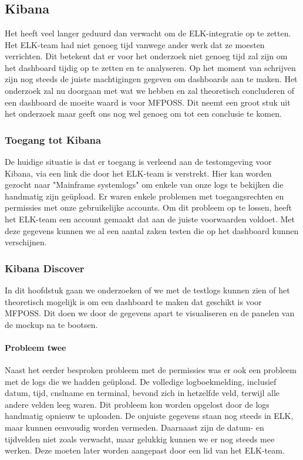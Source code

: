 \chapter{}%
\label{ch:Opstellen Dashboard}

\section{Kibana}

Het heeft veel langer geduurd dan verwacht om de ELK-integratie op te zetten. Het ELK-team had niet genoeg tijd vanwege ander werk dat ze moesten verrichten. Dit betekent dat er voor het onderzoek niet genoeg tijd zal zijn om het dashboard tijdig op te zetten en te analyseren. Op het moment van schrijven zijn nog steeds de juiste machtigingen gegeven om dashboards aan te maken. Het onderzoek zal nu doorgaan met wat we hebben en zal theoretisch concluderen of een dashboard de moeite waard is voor MFPOSS. Dit neemt een groot stuk uit het onderzoek maar geeft ons nog wel genoeg om tot een conclusie te komen.

\subsection{Toegang tot Kibana}
De huidige situatie is dat er toegang is verleend aan de testomgeving voor Kibana, via een link die door het ELK-team is verstrekt. Hier kan worden gezocht naar "Mainframe systemlogs" om enkele van onze logs te bekijken die handmatig zijn geüpload. Er waren enkele problemen met toegangsrechten en permissies met onze gebruikelijke accounts. Om dit probleem op te lossen, heeft het ELK-team een account gemaakt dat aan de juiste voorwaarden voldoet. Met deze gegevens kunnen we al een aantal zaken testen die op het dashboard kunnen verschijnen.

\subsection{Kibana Discover}
In dit hoofdstuk gaan we onderzoeken of we met de testlogs kunnen zien of het theoretisch mogelijk is om een dashboard te maken dat geschikt is voor MFPOSS. Dit doen we door de gegevens apart te visualiseren en de panelen van de mockup na te bootsen.

\subsubsection{Probleem twee}
Naast het eerder besproken probleem met de permissies was er ook een probleem met de logs die we hadden geüpload. De volledige logboekmelding, inclusief datum, tijd, cnslname en terminal, bevond zich in hetzelfde veld, terwijl alle andere velden leeg waren. Dit probleem kon worden opgelost door de logs handmatig opnieuw te uploaden. De onjuiste gegevens staan nog steeds in ELK, maar kunnen eenvoudig worden vermeden. Daarnaast zijn de datum- en tijdvelden niet zoals verwacht, maar gelukkig kunnen we er nog steeds mee werken. Deze moeten later worden aangepast door een lid van het ELK-team.

